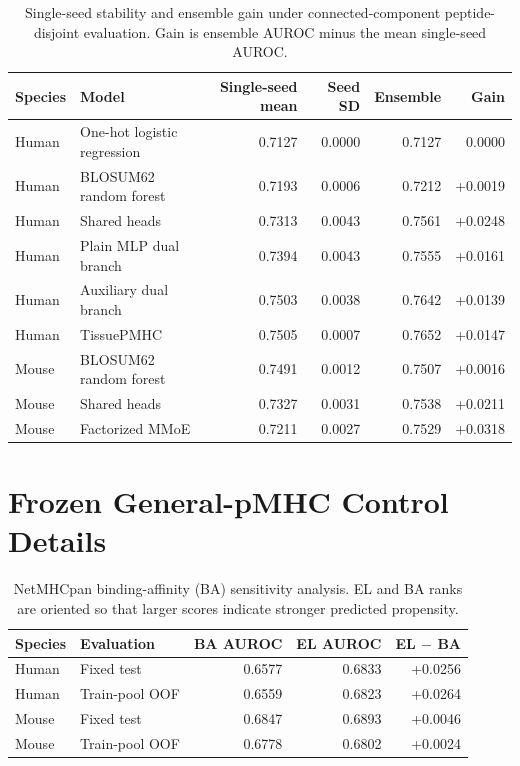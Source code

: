 \begin{table}[htbp]
\centering
\caption{Single-seed stability and ensemble gain under connected-component peptide-disjoint evaluation. Gain is ensemble AUROC minus the mean single-seed AUROC.}
\label{tab:appendix-strict-seeds}
\footnotesize
\setlength{\tabcolsep}{2pt}
\begin{tabular}{llrrrr}
\toprule
Species & Model & Single-seed mean & Seed SD & Ensemble & Gain \\
\midrule
Human & One-hot logistic regression & 0.7127 & 0.0000 & 0.7127 & 0.0000 \\
Human & BLOSUM62 random forest & 0.7193 & 0.0006 & 0.7212 & +0.0019 \\
Human & Shared heads & 0.7313 & 0.0043 & 0.7561 & +0.0248 \\
Human & Plain MLP dual branch & 0.7394 & 0.0043 & 0.7555 & +0.0161 \\
Human & Auxiliary dual branch & 0.7503 & 0.0038 & 0.7642 & +0.0139 \\
Human & TissuePMHC & 0.7505 & 0.0007 & 0.7652 & +0.0147 \\
Mouse & BLOSUM62 random forest & 0.7491 & 0.0012 & 0.7507 & +0.0016 \\
Mouse & Shared heads & 0.7327 & 0.0031 & 0.7538 & +0.0211 \\
Mouse & Factorized MMoE & 0.7211 & 0.0027 & 0.7529 & +0.0318 \\
\bottomrule
\end{tabular}
\end{table}

\clearpage
\section{Frozen General-pMHC Control Details}

\begin{table}[htbp]
\centering
\caption{NetMHCpan binding-affinity (BA) sensitivity analysis. EL and BA ranks are oriented so that larger scores indicate stronger predicted propensity.}
\label{tab:appendix-netmhcpan-el-ba}
\small
\setlength{\tabcolsep}{4pt}
\begin{tabular}{llrrr}
\toprule
Species & Evaluation & BA AUROC & EL AUROC & EL $-$ BA \\
\midrule
Human & Fixed test & 0.6577 & 0.6833 & +0.0256 \\
Human & Train-pool OOF & 0.6559 & 0.6823 & +0.0264 \\
Mouse & Fixed test & 0.6847 & 0.6893 & +0.0046 \\
Mouse & Train-pool OOF & 0.6778 & 0.6802 & +0.0024 \\
\bottomrule
\end{tabular}
\end{table}

